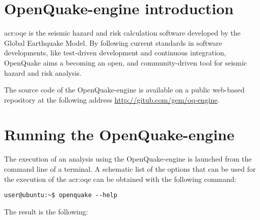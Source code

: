 \section{OpenQuake-engine introduction}
\gls{acr:oqe} is the seismic hazard and risk calculation software developed by
the Global Earthquake Model. By following current standards in software developments, like test-driven development and continuous
integration, OpenQuake aims a becoming an open, and community-driven tool for
seismic hazard and risk analysis.

The source code of the OpenQuake-engine is available on a public web-based repository
at the following address \href{http://gitub.com/gem/oq-engine}{http://gitub.com/gem/oq-engine}.
\section{Running the OpenQuake-engine}
\label{sec:intro}
The execution of an analysis using the OpenQuake-engine is launched from 
the command line of a terminal. A schematic list of the options that 
can be used for the execution of the \gls{acr:oqe} can be obtained 
with the following command:
\begin{Verbatim}[frame=single, commandchars=\\\{\}, fontsize=\small]
user@ubuntu:~$ openquake --help
\end{Verbatim}
The result is the following:


